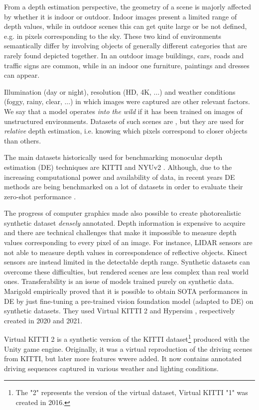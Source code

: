 From a depth estimation perspective, the geometry of a scene is majorly affected by whether it is indoor or outdoor.
Indoor images present a limited range of depth values, while in outdoor scenes this can get quite large or be not defined, e.g. in pixels corresponding to the sky.
These two kind of environments semantically differ by involving objects of generally different categories that are rarely found depicted together.
In an outdoor image buildings, cars, roads and traffic signs are common, while in an indoor one furniture, paintings and dresses can appear.

Illumination (day or night), resolution (HD, 4K, ...) and weather conditions (foggy, rainy, clear, ...) in which images were captured are other relevant factors.
We say that a model operates \textit{into the wild} if it has been trained on images of unstructured environments.
Datasets of such scenes are \cite{DIW} \cite{ReDWeb} \cite{Youtube3D}, but they are used for \textit{relative} depth estimation, i.e. knowing which pixels correspond to closer objects than others.

The main datasets historically used for benchmarking monocular depth estimation (DE) techniques are KITTI \cite{KITTI} and NYUv2 \cite{NYUv2}.
Although, due to the increasing computational power and availability of data, in recent years DE methods are being benchmarked on a lot of datasets in order to evaluate their zero-shot performance \cite{MiDas, PatchFusion, Marigold, ZoeDepth}.

The progress of computer graphics made also possible to create photorealistic synthetic dataset \textit{densely} annotated.
Depth information is expensive to acquire and there are technical challenges that make it impossible to measure depth values corresponding to every pixel of an image.
For instance, LIDAR sensors are not able to measure depth values in correspondence of reflective objects.
Kinect sensors are instead limited in the detectable depth range.
Synthetic datasets can overcome these difficulties, but rendered scenes are less complex than real world ones.
Transferability is an issue of models trained purely on synthetic data.
Marigold \cite{Marigold} empirically proved that it is possible to obtain SOTA performances in DE by just fine-tuning a pre-trained vision foundation model (adapted to DE) on synthetic datasets.
They used Virtual KITTI 2 \cite{VirtualKITTI2} and Hypersim \cite{Hypersim}, respectively created in 2020 and 2021.

Virtual KITTI 2 \cite{VirtualKITTI2} is a synthetic version of the KITTI dataset\footnote{The "2" represents the version of the virtual dataset, Virtual KITTI "1" was created in 2016.} produced with the Unity game engine.
Originally, it was a virtual reproduction of the driving scenes from KITTI, but later more features wwere added.
It now contains annotated driving sequences captured in various weather and lighting conditions.


